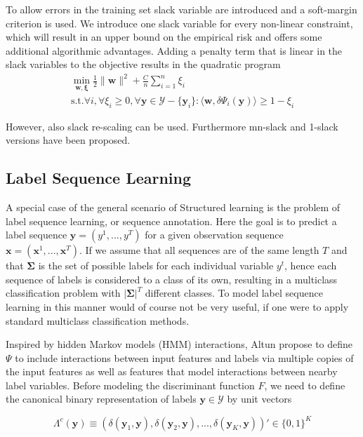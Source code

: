 To allow errors in the training set slack variable are introduced and a soft-margin criterion is used. We introduce one slack variable for every non-linear constraint, which will result in an upper bound on the empirical risk and offers some additional algorithmic advantages. Adding a penalty term that is linear in the slack variables to the objective results in the quadratic program
\begin{eqnarray} \label{eq:svm}
\min_{\mathbf{w},\mathbf{\xi}} \frac{1}{2} \lVert \mathbf{w} \rVert^2 + \frac{C}{n} \sum_{i=1}^n \xi_i \nonumber \\
\text{s.t.} \forall i, \forall\xi_i \geq 0, \forall \mathbf{y} \in \mathcal{Y}-\{\mathbf{y}_i\}: 
\langle \mathbf{w},\delta\Psi_i(\mathbf{y})\rangle \geq 1 - \xi_i
\end{eqnarray}

However, also slack re-scaling can be used. Furthermore mn-slack and 1-slack versions have been proposed.

\subsection{Label Sequence Learning}
\label{svmhmm}
A special case of the general scenario of Structured learning is the problem of label sequence learning, or sequence annotation. Here the goal is to predict a label sequence $\mathbf{y} = (y^1,...,y^T)$ for a given observation sequence $\mathbf{x} = (\mathbf{x}^1,...,\mathbf{x}^T)$. If we assume that all sequences are of the same length $T$ and that $\mathbf{\Sigma}$ is the set of possible labels for each individual variable $y^t$, hence each sequence of labels is considered to a class of its own, resulting in a multiclass classification problem with $|\mathbf{\Sigma}|^T$ different classes. To model label sequence learning in this manner would of course not be very useful, if one were to apply standard multiclass classification methods.

Inspired by hidden Markov models (HMM) interactions, Altun \etal \cite{altun2003hidden} propose to define $\Psi$ to include interactions between input features and labels via multiple copies of the input features as well as features that model interactions between nearby label variables. Before modeling the discriminant function $F$, we need to define the canonical binary representation of labels $\mathbf{y} \in \mathcal{Y}$ by unit vectors

\begin{equation}
\Lambda^c(\mathbf{y}) \equiv (\delta(\mathbf{y}_1,\mathbf{y}),\delta(\mathbf{y}_2,\mathbf{y}),...,\delta(\mathbf{y}_K,\mathbf{y}))' \in \{0,1\}^K
\end{equation}


